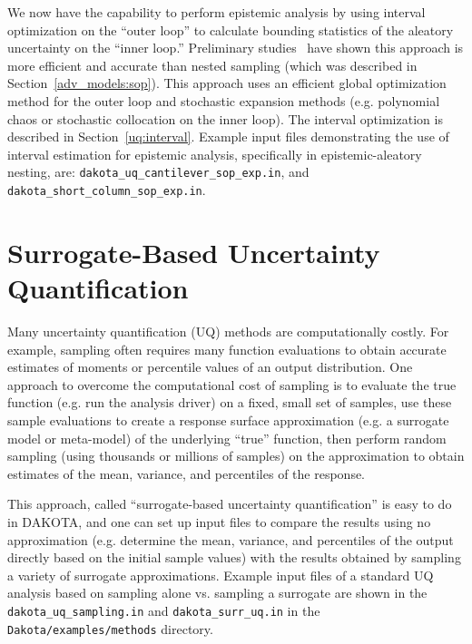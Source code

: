 We now have the capability to perform epistemic analysis by 
using interval optimization on the ``outer loop'' to calculate bounding 
statistics of the aleatory uncertainty on the ``inner loop.''  
Preliminary studies~\cite{Eld09b} have shown this approach is more efficient 
and accurate than nested sampling (which was described in 
Section~\ref{adv_models:sop}).  This approach uses 
an efficient global optimization method for the outer loop and 
stochastic expansion methods (e.g. polynomial chaos or stochastic 
collocation on the inner loop).  The interval optimization is described in 
Section~\ref{uq:interval}.  Example input files demonstrating 
the use of interval estimation for epistemic analysis, 
specifically in epistemic-aleatory nesting, are: 
\texttt{dakota\_uq\_cantilever\_sop\_exp.in}, and
\texttt{dakota\_short\_column\_sop\_exp.in}. 

\section{Surrogate-Based Uncertainty Quantification} \label{adv_models:sbuq}

Many uncertainty quantification (UQ) methods are computationally costly. 
For example, sampling often requires many function evaluations to obtain 
accurate estimates of moments or percentile values of an output distribution.  
One approach to overcome the computational cost of sampling is to 
evaluate the true function (e.g. run the analysis driver) on a fixed, small
set of samples, use these sample evaluations to 
create a response surface approximation (e.g. a surrogate model or meta-model)
of the underlying ``true'' function, then perform random sampling (using 
thousands or millions of samples) on the approximation to obtain estimates 
of the mean, variance, and percentiles of the response. 

This approach, called ``surrogate-based uncertainty quantification'' 
is easy to do in DAKOTA, and one can set up input files to compare the 
results using no approximation (e.g. determine the mean, variance, and 
percentiles of the output directly based on the initial sample values) 
with the results obtained by sampling a variety of surrogate approximations.  
Example input files of a standard UQ analysis based on sampling alone vs. 
sampling a surrogate are shown in the \texttt{dakota\_uq\_sampling.in} and 
\texttt{dakota\_surr\_uq.in} in the \texttt{Dakota/examples/methods}
directory. 

